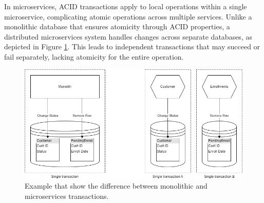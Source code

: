 In microservices, ACID transactions apply to local operations within a single microservice,
complicating atomic operations across multiple services. Unlike a monolithic database that ensures
atomicity through ACID properties, a distributed microservices system handles changes across
separate databases, as depicted in Figure \ref{fig:3_transaction}. This leads to independent
transactions that may succeed or fail separately, lacking atomicity for the entire operation.


\begin{figure}
    \centering
    \includegraphics[scale=0.5]{Pictures/3_transaction.png}
    \caption{Example that show the difference between monolithic and microservices transactions.}
    \label{fig:3_transaction}
\end{figure}

